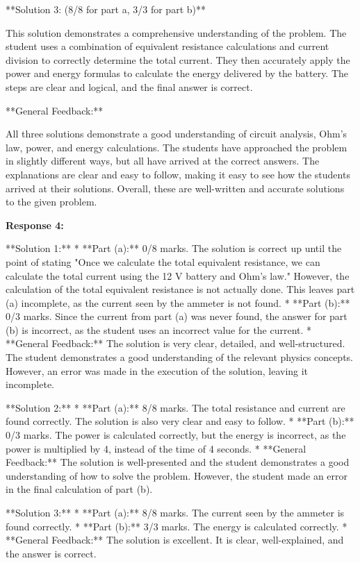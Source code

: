 \documentclass[a4paper,11pt]{article}
\begin{document}
**Solution 3: (8/8 for part a, 3/3 for part b)**

This solution demonstrates a comprehensive understanding of the problem. The student uses a combination of equivalent resistance calculations and current division to correctly determine the total current. They then accurately apply the power and energy formulas to calculate the energy delivered by the battery. The steps are clear and logical, and the final answer is correct.

**General Feedback:**

All three solutions demonstrate a good understanding of circuit analysis, Ohm's law, power, and energy calculations. The students have approached the problem in slightly different ways, but all have arrived at the correct answers. The explanations are clear and easy to follow, making it easy to see how the students arrived at their solutions. Overall, these are well-written and accurate solutions to the given problem.

\bigskip    
\textbf{Response 4:}

**Solution 1:**
* **Part (a):** 0/8 marks. The solution is correct up until the point of stating "Once we calculate the total equivalent resistance, we can calculate the total current using the 12 V battery and Ohm's law." However, the calculation of the total equivalent resistance is not actually done. This leaves part (a) incomplete, as the current seen by the ammeter is not found.
* **Part (b):** 0/3 marks. Since the current from part (a) was never found, the answer for part (b) is incorrect, as the student uses an incorrect value for the current.
* **General Feedback:** The solution is very clear, detailed, and well-structured. The student demonstrates a good understanding of the relevant physics concepts. However, an error was made in the execution of the solution, leaving it incomplete.

**Solution 2:**
* **Part (a):** 8/8 marks. The total resistance and current are found correctly. The solution is also very clear and easy to follow. 
* **Part (b):** 0/3 marks. The power is calculated correctly, but the energy is incorrect, as the power is multiplied by 4, instead of the time of 4 seconds.
* **General Feedback:** The solution is well-presented and the student demonstrates a good understanding of how to solve the problem. However, the student made an error in the final calculation of part (b).

**Solution 3:**
* **Part (a):** 8/8 marks. The current seen by the ammeter is found correctly.
* **Part (b):** 3/3 marks. The energy is calculated correctly.
* **General Feedback:** The solution is excellent. It is clear, well-explained, and the answer is correct.
\end{document}
